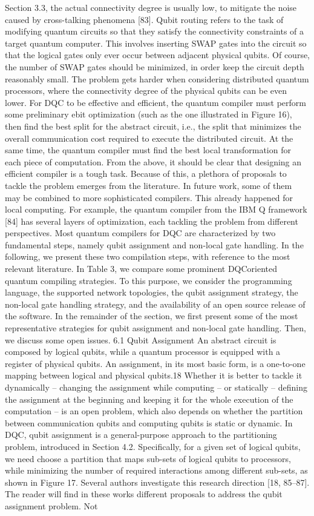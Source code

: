 Section 3.3, the actual connectivity degree is usually low, to mitigate the noise caused by cross-talking phenomena [83]. Qubit routing refers to the task of modifying quantum circuits so that they satisfy the connectivity constraints of a target quantum computer. This involves inserting SWAP gates into the circuit so that the logical gates only ever occur between adjacent physical qubits. Of course, the number of SWAP gates should be minimized, in order keep the circuit depth reasonably small. The problem gets harder when considering distributed quantum processors, where the connectivity degree of the physical qubits can be even lower. For DQC to be effective and efficient, the quantum compiler must perform some preliminary ebit optimization (such as the one illustrated in Figure 16), then find the best split for the abstract circuit, i.e., the split that minimizes the overall communication cost required to execute the distributed circuit. At the same time, the quantum compiler must find the best local transformation for each piece of computation. From the above, it should be clear that designing an efficient compiler is a tough task. Because of this, a plethora of proposals to tackle the problem emerges from the literature. In future work, some of them may be combined to more sophisticated compilers. This already happened for local computing. For example, the quantum compiler from the IBM Q framework [84] has several layers of optimization, each tackling the problem from different perspectives. Most quantum compilers for DQC are characterized by two fundamental steps, namely qubit assignment and non-local gate handling. In the following, we present these two compilation steps, with reference to the most relevant literature. In Table 3, we compare some prominent DQCoriented quantum compiling strategies. To this purpose, we consider the programming language, the supported network topologies, the qubit assignment strategy, the non-local gate handling strategy, and the availability of an open source release of the software. In the remainder of the section, we first present some of the most representative strategies for qubit assignment and non-local gate handling. Then, we discuss some open issues. 6.1 Qubit Assignment An abstract circuit is composed by logical qubits, while a quantum processor is equipped with a register of physical qubits. An assignment, in its most basic form, is a one-to-one mapping between logical and physical qubits.18 Whether it is better to tackle it dynamically – changing the assignment while computing – or statically – defining the assignment at the beginning and keeping it for the whole execution of the computation – is an open problem, which also depends on whether the partition between communication qubits and computing qubits is static or dynamic. In DQC, qubit assignment is a general-purpose approach to the partitioning problem, introduced in Section 4.2. Specifically, for a given set of logical qubits, we need choose a partition that maps sub-sets of logical qubits to processors, while minimizing the number of required interactions among different sub-sets, as shown in Figure 17.  Several authors investigate this research direction [18, 85–87]. The reader will find in these works different proposals to address the qubit assignment problem. Not 